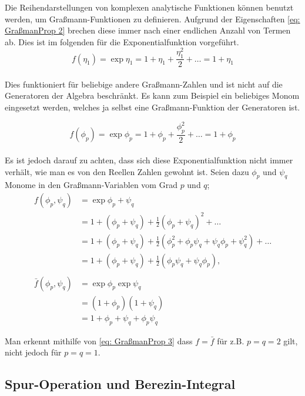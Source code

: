 \noindent Die Reihendarstellungen von komplexen analytische Funktionen können benutzt werden, um Graßmann-Funktionen zu definieren. Aufgrund der Eigenschaften \eqref{eq: GraßmanProp 2} brechen diese immer nach einer endlichen Anzahl von Termen ab. Dies ist im folgenden für die Exponentialfunktion vorgeführt. 
\begin{equation} \label{eq: exp()}
    f(\eta_1) = \exp{\eta_1} = 1 + \eta_1 + \frac{\eta_1^2}{2} + \dots = 1 + \eta_1
\end{equation}
\vspace{0.2cm}\\
Dies funktioniert für beliebige andere Graßmann-Zahlen und ist nicht auf die Generatoren der Algebra beschränkt. Es kann zum Beispiel ein beliebiges Monom eingesetzt werden, welches ja selbst eine Graßmann-Funktion der Generatoren ist. 

\begin{equation} \label{eq: exp()_2}
    f(\phi_p) = \exp{\phi_p} = 1 + \phi_p + \frac{\phi_p^2}{2} + \dots = 1 + \phi_p
\end{equation}\\

\noindent Es ist jedoch darauf zu achten, dass sich diese Exponentialfunktion nicht immer verhält, wie man es von den Reellen Zahlen gewohnt ist. Seien dazu $\phi_p$ und $\psi_q$ Monome in den Graßmann-Variablen vom Grad $p$ und $q$; 
\begin{align}
    f(\phi_p, \psi_q) 
        &= \exp{\phi_p + \psi_q} \nonumber \\
        &= 1 + (\phi_p + \psi_q) + \frac{1}{2}(\phi_p + \psi_q)^2 + \dots \nonumber\\
        &= 1 + (\phi_p + \psi_q) + \frac{1}{2}(\phi_p^2 + \phi_p\psi_q +\psi_q\phi_p + \psi_q^2) + \dots \nonumber\\
     &= 1 + (\phi_p + \psi_q) + \frac{1}{2}( \phi_p\psi_q +\psi_q\phi_p), \\
    \nonumber \\
    \bar{f}(\phi_p, \psi_q) 
        &= \exp{\phi_p}\exp{\psi_q} \nonumber \\
        &= (1 + \phi_p)(1 +\psi_q) \nonumber \\
    &= 1+  \phi_p + \psi_q + \phi_p\psi_q 
\end{align}

\noindent Man erkennt mithilfe von \eqref{eq: GraßmanProp 3} dass $f = \bar f$ für z.B. $p=q = 2$ gilt, nicht jedoch für $ p = q = 1 $.

\subsection{Spur-Operation und Berezin-Integral}

